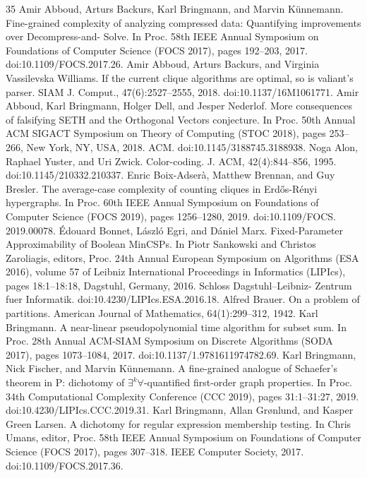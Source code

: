 \documentclass[10pt,a4paper]{article}
\begin{document}
\begin{thebibliography}{35}
Amir Abboud, Arturs Backurs, Karl Bringmann, and Marvin Künnemann. Fine-grained complexity of analyzing compressed data: Quantifying improvements over Decompress-and- Solve. In Proc. 58th IEEE Annual Symposium on Foundations of Computer Science (FOCS 2017), pages 192–203, 2017. doi:10.1109/FOCS.2017.26.
Amir Abboud, Arturs Backurs, and Virginia Vassilevska Williams. If the current clique algorithms are optimal, so is valiant’s parser. SIAM J. Comput., 47(6):2527–2555, 2018. doi:10.1137/16M1061771.
Amir Abboud, Karl Bringmann, Holger Dell, and Jesper Nederlof. More consequences of falsifying SETH and the Orthogonal Vectors conjecture. In Proc. 50th Annual ACM SIGACT Symposium on Theory of Computing (STOC 2018), pages 253–266, New York, NY, USA, 2018. ACM. doi:10.1145/3188745.3188938.
Noga Alon, Raphael Yuster, and Uri Zwick. Color-coding. J. ACM, 42(4):844–856, 1995. doi:10.1145/210332.210337.
Enric Boix-Adserà, Matthew Brennan, and Guy Bresler. The average-case complexity of counting cliques in Erdős-Rényi hypergraphs. In Proc. 60th IEEE Annual Symposium on Foundations of Computer Science (FOCS 2019), pages 1256–1280, 2019. doi:10.1109/FOCS. 2019.00078.
Édouard Bonnet, László Egri, and Dániel Marx. Fixed-Parameter Approximability of Boolean MinCSPs. In Piotr Sankowski and Christos Zaroliagis, editors, Proc. 24th Annual European Symposium on Algorithms (ESA 2016), volume 57 of Leibniz International Proceedings in Informatics (LIPIcs), pages 18:1–18:18, Dagstuhl, Germany, 2016. Schloss Dagstuhl–Leibniz- Zentrum fuer Informatik. doi:10.4230/LIPIcs.ESA.2016.18.
Alfred Brauer. On a problem of partitions. American Journal of Mathematics, 64(1):299–312, 1942.
Karl Bringmann. A near-linear pseudopolynomial time algorithm for subset sum. In Proc. 28th Annual ACM-SIAM Symposium on Discrete Algorithms (SODA 2017), pages 1073–1084, 2017. doi:10.1137/1.9781611974782.69.
Karl Bringmann, Nick Fischer, and Marvin Künnemann. A fine-grained analogue of Schaefer’s theorem in P: dichotomy of $\exists^k\forall$-quantified first-order graph properties. In Proc. 34th Computational Complexity Conference (CCC 2019), pages 31:1–31:27, 2019. doi:10.4230/LIPIcs.CCC.2019.31.
Karl Bringmann, Allan Grønlund, and Kasper Green Larsen. A dichotomy for regular expression membership testing. In Chris Umans, editor, Proc. 58th IEEE Annual Symposium on Foundations of Computer Science (FOCS 2017), pages 307–318. IEEE Computer Society, 2017. doi:10.1109/FOCS.2017.36.

\end{thebibliography}
\end{document}
